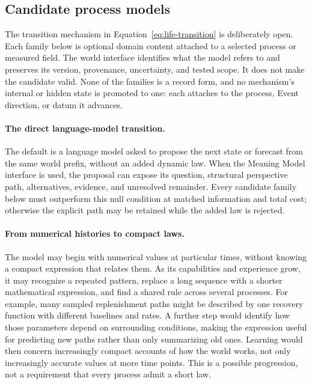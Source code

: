 \documentclass[10pt]{article}
\begin{document}
\subsection{Candidate process models}
\label{sec:functions}

The transition mechanism in Equation~\ref{eq:life-transition} is deliberately
open. Each family below is optional domain content attached to a selected
process or measured field. The world interface identifies what the model refers
to and preserves its version, provenance, uncertainty, and tested scope. It
does not make the candidate valid. None of the families is a record form, and no
mechanism's internal or hidden state is promoted to one: each attaches to the
process, Event direction, or datum it advances.

\paragraph{The direct language-model transition.}
The default is a language model asked to propose the next state or forecast
from the same world prefix, without an added dynamic law. When the Meaning
Model interface is used, the proposal can expose its question, structural
perspective path,
alternatives, evidence, and unresolved remainder. Every candidate family below
must outperform this null condition at matched information and total cost;
otherwise the explicit path may be retained while the added law is rejected.

\paragraph{From numerical histories to compact laws.}
The model may begin with numerical values at particular times, without knowing
a compact expression that relates them. As its capabilities and experience
grow, it may recognize a repeated pattern, replace a long sequence with a
shorter mathematical expression, and find a shared rule across several
processes. For example, many sampled replenishment paths might be described
by one recovery function with different baselines and rates. A further step
would identify how those parameters depend on surrounding conditions, making
the expression useful for predicting new paths rather than only summarizing
old ones. Learning would then concern increasingly compact accounts of how
the world works, not only increasingly accurate values at more time points.
This is a possible progression, not a requirement that every process admit a
short law.
\end{document}
